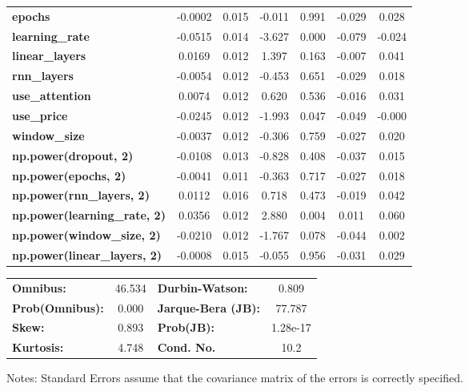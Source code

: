 \begin{center}
\begin{tabular}{lcccccc}
\textbf{epochs}                            &      -0.0002  &        0.015     &    -0.011  &         0.991        &       -0.029    &        0.028     \\
\textbf{learning\_rate}                    &      -0.0515  &        0.014     &    -3.627  &         0.000        &       -0.079    &       -0.024     \\
\textbf{linear\_layers}                    &       0.0169  &        0.012     &     1.397  &         0.163        &       -0.007    &        0.041     \\
\textbf{rnn\_layers}                       &      -0.0054  &        0.012     &    -0.453  &         0.651        &       -0.029    &        0.018     \\
\textbf{use\_attention}                    &       0.0074  &        0.012     &     0.620  &         0.536        &       -0.016    &        0.031     \\
\textbf{use\_price}                        &      -0.0245  &        0.012     &    -1.993  &         0.047        &       -0.049    &       -0.000     \\
\textbf{window\_size}                      &      -0.0037  &        0.012     &    -0.306  &         0.759        &       -0.027    &        0.020     \\
\textbf{np.power(dropout, 2)}              &      -0.0108  &        0.013     &    -0.828  &         0.408        &       -0.037    &        0.015     \\
\textbf{np.power(epochs, 2)}               &      -0.0041  &        0.011     &    -0.363  &         0.717        &       -0.027    &        0.018     \\
\textbf{np.power(rnn\_layers, 2)}          &       0.0112  &        0.016     &     0.718  &         0.473        &       -0.019    &        0.042     \\
\textbf{np.power(learning\_rate, 2)}       &       0.0356  &        0.012     &     2.880  &         0.004        &        0.011    &        0.060     \\
\textbf{np.power(window\_size, 2)}         &      -0.0210  &        0.012     &    -1.767  &         0.078        &       -0.044    &        0.002     \\
\textbf{np.power(linear\_layers, 2)}       &      -0.0008  &        0.015     &    -0.055  &         0.956        &       -0.031    &        0.029     \\
\bottomrule
\end{tabular}
\begin{tabular}{lclc}
\textbf{Omnibus:}       & 46.534 & \textbf{  Durbin-Watson:     } &    0.809  \\
\textbf{Prob(Omnibus):} &  0.000 & \textbf{  Jarque-Bera (JB):  } &   77.787  \\
\textbf{Skew:}          &  0.893 & \textbf{  Prob(JB):          } & 1.28e-17  \\
\textbf{Kurtosis:}      &  4.748 & \textbf{  Cond. No.          } &     10.2  \\
\bottomrule
\end{tabular}
\end{center}

Notes: \newline
 [1] Standard Errors assume that the covariance matrix of the errors is correctly specified.